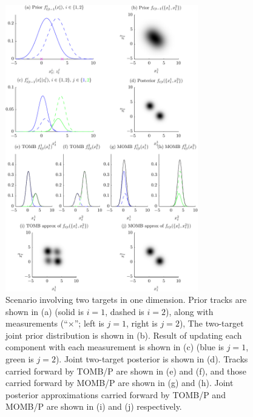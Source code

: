 \documentclass[journal,twoside]{IEEEtran}
\theoremstyle{plain}
\begin{document}
\begin{figure}[tb]
\centering
\includegraphics[width=3.3in]{figure2.pdf}
\caption{Scenario involving two targets in one dimension. Prior tracks are shown in (a) (solid is $i=1$, dashed is $i=2$), along with measurements (``{\color{magenta}$\times$}''; left is $j=1$, right is $j=2$), The two-target joint prior distribution is shown in (b). Result of updating each component with each measurement is shown in (c) ({\color{blue}blue} is $j=1$, {\color{green}green} is $j=2$). Joint two-target posterior is shown in (d). Tracks carried forward by TOMB/P are shown in (e) and (f), and those carried forward by MOMB/P are shown in (g) and (h). Joint posterior approximations carried forward by TOMB/P and MOMB/P are shown in (i) and (j) respectively.}
\label{fig:MarginalisationDiagram}
\end{figure}
\end{document}
